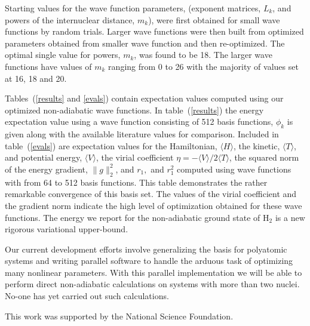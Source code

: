 Starting values for the wave function parameters, (exponent matrices,
$L_k$, and powers of the internuclear distance, $m_k$), were first
obtained for small wave functions by random trials. Larger wave functions
were then built from optimized parameters obtained from smaller
wave function and then re-optimized. The optimal single value
for  powers, $m_k$, was found to be 18. The larger wave functions
have values of $m_k$ ranging from 0 to 26 with the majority of
values set at 16, 18 and 20.   
 
Tables~(\ref{results} and \ref{evals})
contain expectation values computed using our 
optimized non-adiabatic wave functions. In table~(\ref{results}) 
the energy expectation value using a wave function consisting of
512 basis functions, $\phi_k$ is given
along with the available literature values for comparison. 
Included in table~(\ref{evals}) are expectation values for the Hamiltonian, 
$\langle H \rangle$, the kinetic, $\langle T \rangle$, and
potential energy, $\langle V \rangle$, the virial coefficient 
$\eta=-\langle V \rangle /2\langle T \rangle$, the squared norm
of the energy gradient, $\|g\|_{2}^{2}$, and
$r_{1},$ and  $r_{1}^{2}$ computed using wave functions with from 64 to 512
basis functions. This table demonstrates the rather remarkable convergence
of this basis set. 
The values of the virial coefficient and the
gradient norm indicate the high level of optimization
obtained for these wave functions.
The energy we report for the non-adiabatic
ground state of H$_2$ is a new rigorous variational upper-bound. 



Our current development efforts involve generalizing the basis for 
polyatomic systems and writing parallel software to handle
the arduous task of optimizing many nonlinear parameters. 
With this parallel implementation we will be able to perform
direct non-adiabatic calculations on systems with more than two nuclei.
No-one has yet carried out such calculations.
 

\acknowledgements
This work was supported by the National Science Foundation.



